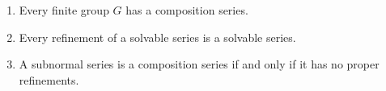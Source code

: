 \begin{enumerate}
\item[(i)] Every finite group $G$ has a composition series.
\item[(ii)] Every refinement of a solvable series is a solvable series.
\item[(iii)] A subnormal series is a composition series if and only if it has no proper refinements.
\end{enumerate}
